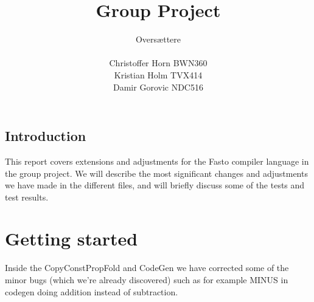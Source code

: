 \documentclass[12pt]{article}
\author{Oversættere\\\\Christoffer Horn BWN360\\Kristian Holm TVX414\\Damir Gorovic NDC516}
\title{Group Project}
\begin{document}
\maketitle
\hfil \break
\hfil \break
\hfil \break
\subsection*{Introduction}
This report covers extensions and adjustments for the Fasto compiler language in the group project. We will describe the most significant changes and adjustments we have made in the different files, and will briefly discuss some of the tests and test results.
\pagebreak
\tableofcontents
\pagebreak
\section{Getting started}
Inside the CopyConstPropFold and CodeGen we have corrected some of the minor bugs (which we're already discovered) such as for example MINUS in codegen doing addition instead of subtraction. 
\end{document}
